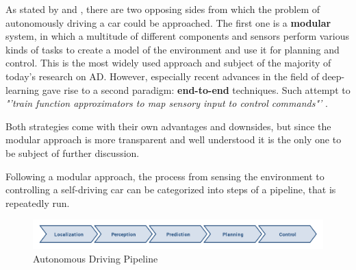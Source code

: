 As stated by \cite{Codevilla2018} and \cite{Friedman2019}, there are two opposing sides from which the problem of autonomously driving a car could be approached. The first one is a \textbf{modular} system, in which a multitude of different components and sensors perform various kinds of tasks to create a model of the environment and use it for planning and control. This is the most widely used approach and subject of the majority of today's research on AD. However, especially recent advances in the field of deep-learning gave rise to a second paradigm: \textbf{end-to-end} techniques. Such attempt to \textit{"'train function approximators to map sensory input to control commands"'} \cite{Codevilla2018}.

Both strategies come with their own advantages and downsides, but since the modular approach is more transparent and well understood it is the only one to be subject of further discussion.

Following a modular approach, the process from sensing the environment to controlling a self-driving car can be categorized into steps of a pipeline, that is repeatedly run. 

\begin{figure}[H]
	\centering
	\includegraphics[width=\textwidth]{98_images/ad_pipeline.png}
	\caption{Autonomous Driving Pipeline}
	\label{fig:autonomous_driving_pipeline}
\end{figure}

